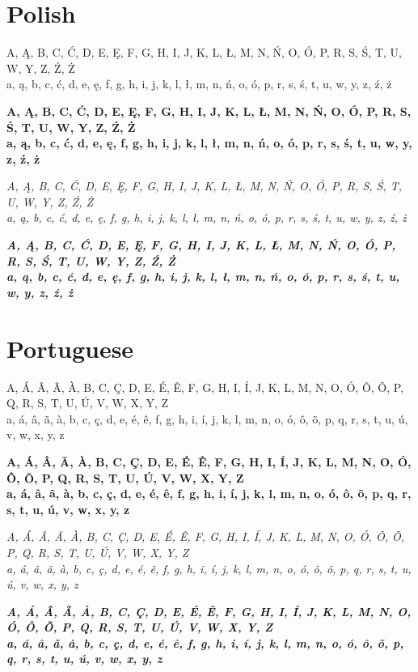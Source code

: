 \documentclass[12pt]{article}
\begin{document}
\section{Polish}
A, Ą, B, C, Ć, D, E, Ę, F, G, H, I, J, K, L, Ł, M, N, Ń, O, Ó, P, R, S, Ś, T, U, W, Y, Z, Ź, Ż \\
a, ą, b, c, ć, d, e, ę, f, g, h, i, j, k, l, ł, m, n, ń, o, ó, p, r, s, ś, t, u, w, y, z, ź, ż

\textbf{
A, Ą, B, C, Ć, D, E, Ę, F, G, H, I, J, K, L, Ł, M, N, Ń, O, Ó, P, R, S, Ś, T, U, W, Y, Z, Ź, Ż \\
a, ą, b, c, ć, d, e, ę, f, g, h, i, j, k, l, ł, m, n, ń, o, ó, p, r, s, ś, t, u, w, y, z, ź, ż
}

\textit{
A, Ą, B, C, Ć, D, E, Ę, F, G, H, I, J, K, L, Ł, M, N, Ń, O, Ó, P, R, S, Ś, T, U, W, Y, Z, Ź, Ż \\
a, ą, b, c, ć, d, e, ę, f, g, h, i, j, k, l, ł, m, n, ń, o, ó, p, r, s, ś, t, u, w, y, z, ź, ż
}

\textbf{\textit{
A, Ą, B, C, Ć, D, E, Ę, F, G, H, I, J, K, L, Ł, M, N, Ń, O, Ó, P, R, S, Ś, T, U, W, Y, Z, Ź, Ż \\
a, ą, b, c, ć, d, e, ę, f, g, h, i, j, k, l, ł, m, n, ń, o, ó, p, r, s, ś, t, u, w, y, z, ź, ż
}}


\clearpage
\section{Portuguese}
A, Á, Â, Ã, À, B, C, Ç, D, E, É, Ê, F, G, H, I, Í, J, K, L, M, N, O, Ó, Ô, Õ, P, Q, R, S, T, U, Ú, V, W, X, Y, Z \\
a, á, â, ã, à, b, c, ç, d, e, é, ê, f, g, h, i, í, j, k, l, m, n, o, ó, ô, õ, p, q, r, s, t, u, ú, v, w, x, y, z

\textbf{
A, Á, Â, Ã, À, B, C, Ç, D, E, É, Ê, F, G, H, I, Í, J, K, L, M, N, O, Ó, Ô, Õ, P, Q, R, S, T, U, Ú, V, W, X, Y, Z \\
a, á, â, ã, à, b, c, ç, d, e, é, ê, f, g, h, i, í, j, k, l, m, n, o, ó, ô, õ, p, q, r, s, t, u, ú, v, w, x, y, z
}

\textit{
A, Á, Â, Ã, À, B, C, Ç, D, E, É, Ê, F, G, H, I, Í, J, K, L, M, N, O, Ó, Ô, Õ, P, Q, R, S, T, U, Ú, V, W, X, Y, Z \\
a, á, â, ã, à, b, c, ç, d, e, é, ê, f, g, h, i, í, j, k, l, m, n, o, ó, ô, õ, p, q, r, s, t, u, ú, v, w, x, y, z
}

\textbf{\textit{
A, Á, Â, Ã, À, B, C, Ç, D, E, É, Ê, F, G, H, I, Í, J, K, L, M, N, O, Ó, Ô, Õ, P, Q, R, S, T, U, Ú, V, W, X, Y, Z \\
a, á, â, ã, à, b, c, ç, d, e, é, ê, f, g, h, i, í, j, k, l, m, n, o, ó, ô, õ, p, q, r, s, t, u, ú, v, w, x, y, z
}}
\end{document}
